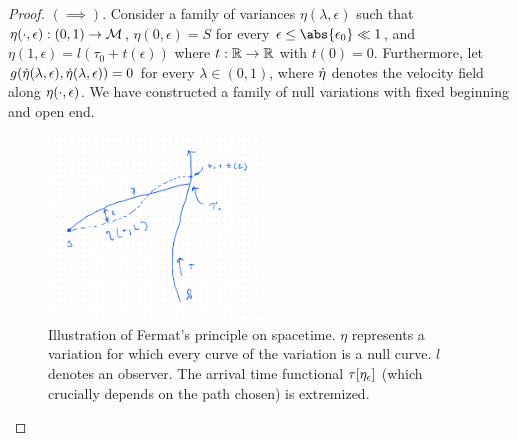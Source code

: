 \begin{proof}
$(\implies)$. Consider a family of variances $\eta(\lambda, \epsilon)$ such that $\eta(\cdot, \epsilon) : (0,1) \to \mathcal{M}$, $\eta(0, \epsilon) = S$ for every $\eps \le \abs{\eps_0} \ll 1$, and $\eta(1, \epsilon) = l(\tau_0 + t(\epsilon))$ where $t: \mathbb{R} \to \mathbb{R}$ with $t(0)=0$.
Furthermore, let $g(\dot{\eta}(\lambda, \epsilon), \dot{\eta}(\lambda, \epsilon)) = 0$ for every $\lambda \in (0,1)$, where $\dot{\eta}$ denotes the velocity field along $\eta(\cdot, \epsilon)$. We have constructed a family of null variations with fixed beginning and open end.
%
\begin{figure}[!htb]
	\centering
	\includegraphics[width=0.5\textwidth]{img/null-variations.png}
	\caption{Illustration of Fermat's principle on spacetime. $\eta$ represents a variation for which every curve of the variation is a null curve. $l$ denotes an observer. The arrival time functional $\tau[\eta_{\epsilon}]$ (which crucially depends on the path chosen) is extremized.}
	\label{fig:fermat-spacetime}
\end{figure}


\end{proof}
